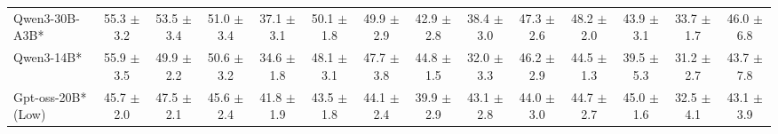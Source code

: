 \begin{table}[hbt]
{\begin{tabular}{l *{13}{c}}


 
\rowcolor{gray!10}
Qwen3-30B-A3B* &
55.3 {\tiny$\pm$ 3.2} &
53.5 {\tiny$\pm$ 3.4} &
51.0 {\tiny$\pm$ 3.4} &
37.1 {\tiny$\pm$ 3.1} &
50.1 {\tiny$\pm$ 1.8} &
49.9 {\tiny$\pm$ 2.9} &
42.9 {\tiny$\pm$ 2.8} &
38.4 {\tiny$\pm$ 3.0} &
47.3 {\tiny$\pm$ 2.6} &
48.2 {\tiny$\pm$ 2.0} &
43.9 {\tiny$\pm$ 3.1} &
33.7 {\tiny$\pm$ 1.7} &
46.0 {\tiny$\pm$ 6.8} \\

 

Qwen3-14B* &
55.9 {\tiny$\pm$ 3.5} &
49.9 {\tiny$\pm$ 2.2} &
50.6 {\tiny$\pm$ 3.2} &
34.6 {\tiny$\pm$ 1.8} &
48.1 {\tiny$\pm$ 3.1} &
47.7 {\tiny$\pm$ 3.8} &
44.8 {\tiny$\pm$ 1.5} &
32.0 {\tiny$\pm$ 3.3} &
46.2 {\tiny$\pm$ 2.9} &
44.5 {\tiny$\pm$ 1.3} &
39.5 {\tiny$\pm$ 5.3} &
31.2 {\tiny$\pm$ 2.7} &
43.7 {\tiny$\pm$ 7.8} \\
\rowcolor{gray!10}
Gpt-oss-20B* (Low) &
45.7 {\tiny$\pm$ 2.0}&
47.5 {\tiny$\pm$ 2.1}&
45.6 {\tiny$\pm$ 2.4}&
41.8 {\tiny$\pm$ 1.9}&
43.5 {\tiny$\pm$ 1.8}&
44.1 {\tiny$\pm$ 2.4}&
39.9 {\tiny$\pm$ 2.9}&
43.1 {\tiny$\pm$ 2.8}&
44.0 {\tiny$\pm$ 3.0}&
44.7 {\tiny$\pm$ 2.7}&
45.0 {\tiny$\pm$ 1.6}&
32.5 {\tiny$\pm$ 4.1}&
43.1 {\tiny$\pm$ 3.9}\\	



\end{tabular}}
\end{table}
